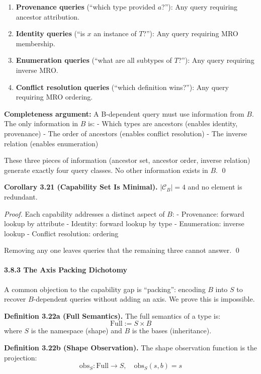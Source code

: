 \begin{enumerate}
\def\labelenumi{\arabic{enumi}.}
\tightlist
\item
  \textbf{Provenance queries} (``which type provided \(a\)?''): Any
  query requiring ancestor attribution.
\item
  \textbf{Identity queries} (``is \(x\) an instance of \(T\)?''): Any
  query requiring MRO membership.
\item
  \textbf{Enumeration queries} (``what are all subtypes of \(T\)?''):
  Any query requiring inverse MRO.
\item
  \textbf{Conflict resolution queries} (``which definition wins?''): Any
  query requiring MRO ordering.
\end{enumerate}

\textbf{Completeness argument:} A B-dependent query must use information
from \(B\). The only information in \(B\) is: - Which types are
ancestors (enables identity, provenance) - The order of ancestors
(enables conflict resolution) - The inverse relation (enables
enumeration)

These three pieces of information (ancestor set, ancestor order, inverse
relation) generate exactly four query classes. No other information
exists in \(B\). \qed

\textbf{Corollary 3.21 (Capability Set Is Minimal).}
\(|\mathcal{C}_B| = 4\) and no element is redundant.

\emph{Proof.} Each capability addresses a distinct aspect of \(B\): -
Provenance: forward lookup by attribute - Identity: forward lookup by
type - Enumeration: inverse lookup - Conflict resolution: ordering

Removing any one leaves queries that the remaining three cannot answer.
\qed

\paragraph{3.8.3 The Axis Packing Dichotomy}\label{the-axis-packing-dichotomy}

A common objection to the capability gap is ``packing'': encoding $B$ into $S$ to recover $B$-dependent queries without adding an axis. We prove this is impossible.

\textbf{Definition 3.22a (Full Semantics).} The full semantics of a type is:
\[\text{Full} := S \times B\]
where $S$ is the namespace (shape) and $B$ is the bases (inheritance).

\textbf{Definition 3.22b (Shape Observation).} The shape observation function is the projection:
\[\text{obs}_S : \text{Full} \to S, \quad \text{obs}_S(s, b) = s\]

